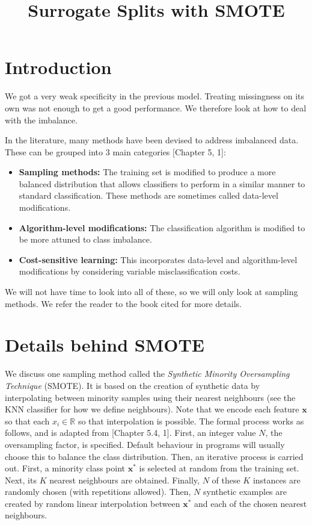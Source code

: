 \documentclass[
]{article}
\title{Surrogate Splits with SMOTE}
\author{}
\date{\vspace{-2.5em}}
\providecommand{\tightlist}{%
  \setlength{\itemsep}{0pt}\setlength{\parskip}{0pt}}
\begin{document}
\maketitle

{
\hypersetup{linkcolor=}
\setcounter{tocdepth}{2}
\tableofcontents
}
\section{Introduction}\label{introduction}

We got a very weak specificity in the previous model. Treating missingness on its own was not enough to get a good performance. We therefore look at how to deal with the imbalance.

In the literature, many methods have been devised to address imbalanced data. These can be grouped into 3 main categories {[}Chapter 5, 1{]}:

\begin{itemize}
\tightlist
\item
  \textbf{Sampling methods:} The training set is modified to produce a more balanced distribution that allows classifiers to perform in a similar manner to standard classification. These methods are sometimes called data-level modifications.
\item
  \textbf{Algorithm-level modifications:} The classification algorithm is modified to be more attuned to class imbalance.
\item
  \textbf{Cost-sensitive learning:} This incorporates data-level and algorithm-level modifications by considering variable misclassification costs.
\end{itemize}

We will not have time to look into all of these, so we will only look at sampling methods. We refer the reader to the book cited for more details.

\section{Details behind SMOTE}\label{details-behind-smote}

We discuss one sampling method called the \textit{Synthetic Minority Oversampling Technique} (SMOTE). It is based on the creation of synthetic data by interpolating between minority samples using their nearest neighbours (see the KNN classifier for how we define neighbours). Note that we encode each feature \(\boldsymbol{x}\) so that each \(x_i \in \mathbb{R}\) so that interpolation is possible. The formal process works as follows, and is adapted from {[}Chapter 5.4, 1{]}. First, an integer value \(N\), the oversampling factor, is specified. Default behaviour in programs will usually choose this to balance the class distribution. Then, an iterative process is carried out. First, a minority class point \(\boldsymbol{x}^*\) is selected at random from the training set. Next, its \(K\) nearest neighbours are obtained. Finally, \(N\) of these \(K\) instances are randomly chosen (with repetitions allowed). Then, \(N\) synthetic examples are created by random linear interpolation between \(\boldsymbol{x}^*\) and each of the chosen nearest neighbours.
\end{document}
